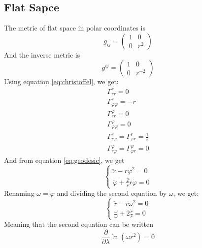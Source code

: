 \documentclass{article}
\begin{document}
\subsection{Flat Sapce}
The metric of flat space in polar coordinates is
\begin{equation}
    g_{ij} = \begin{pmatrix} 1 & 0 \\ 0 & r^2 \end{pmatrix}
\end{equation}
And the inverse metric is
\begin{equation}
    g^{ij} = \begin{pmatrix} 1 & 0 \\ 0 & r^{-2} \end{pmatrix}
\end{equation}
Using equation \ref{eq:christoffel}, we get:
\begin{equation}
\begin{gathered}
    \Gamma^{r}_{rr} = 0
    \\
    \Gamma^{r}_{\varphi\varphi} = -r
    \\
    \Gamma^{\varphi}_{rr} = 0
    \\
    \Gamma^{\varphi}_{\varphi\varphi} = 0
    \\
    \Gamma^{r}_{r\varphi} = \Gamma^{r}_{\varphi r} = \frac{1}{r}
    \\
    \Gamma^{\varphi}_{r\varphi} = \Gamma^{\varphi}_{\varphi r} = 0
\end{gathered}
\end{equation}
And from equation \ref{eq:geodesic}, we get
\begin{equation}
\label{eq:flat}
    \begin{cases}
        \ddot{r} - r\dot{\varphi}^2 = 0
        \\
        \ddot{\varphi} + \frac{2}{r}\dot{r}\dot{\varphi} = 0
    \end{cases}
\end{equation}
Renaming $\omega = \dot{\varphi}$ and dividing the second equation by $\omega$, we get:
\begin{equation}
    \begin{cases}
        \ddot{r} - r\omega^2 = 0
        \\
        \frac{\dot{\omega}}{\omega} + 2\frac{\dot{r}}{r} = 0
    \end{cases}
\end{equation}
Meaning that the second equation can be written 
\begin{equation}
    \frac{\partial}{\partial\lambda}\ln(\omega r^2) = 0
\end{equation}
\end{document}
